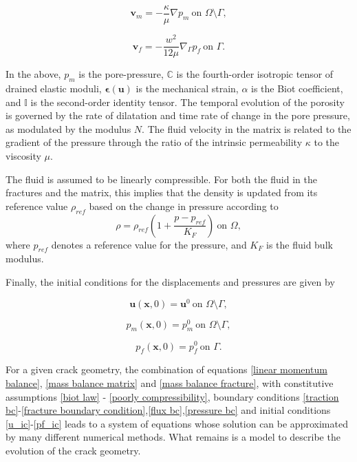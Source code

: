 \begin{equation}\label{darcy law}
    \textbf{v}_m = -\dfrac{\kappa}{\mu}\nabla p_m \ \text{on } \Omega\setminus\Gamma,
\end{equation}

\begin{equation}\label{cubic law}
    \textbf{v}_f = -\dfrac{w^2}{12\mu}\nabla_{\Gamma} p_f \ \text{on } \Gamma.
\end{equation}

In the above, $p_m$ is the pore-pressure, $\mathbb{C}$ is the fourth-order isotropic tensor of drained elastic moduli,  $\boldsymbol\epsilon(\textbf{u})$ is the mechanical strain, $\alpha$ is the Biot coefficient, and $\mathbb{I}$ is the second-order identity tensor. The temporal evolution of the porosity is governed by the rate of dilatation and time rate of change in the pore pressure, as modulated by the modulus $N$.  The fluid velocity in the matrix is related to the gradient of the pressure through the ratio of the intrinsic permeability $\kappa$ to the viscosity $\mu$.    

The fluid is assumed to be linearly compressible.  For both the fluid in the fractures and the matrix, this implies that the density is updated from its reference value $\rho_{ref}$ based on the change in pressure according to
\begin{equation}\label{poorly compressibility}
    \rho = \rho_{ref} \left(1 + \dfrac{p  - p_{ref}}{K_F}\right) \ \text{on } \Omega,
\end{equation}
where $p_{ref}$ denotes a reference value for the pressure, and $K_F$ is the fluid bulk modulus. 

Finally, the initial conditions for the displacements and pressures are given by

\begin{equation}\label{u_ic}
    \textbf{u}(\textbf{x},0) = \textbf{u}^0  \ \text{on } \Omega\setminus\Gamma,
\end{equation}

\begin{equation}\label{pm_ic}
    p_m(\textbf{x},0)= p^0_m  \ \text{on } \Omega\setminus\Gamma,
\end{equation}

\begin{equation}\label{pf_ic}
    p_f(\textbf{x},0) = p^0_f  \ \text{on } \Gamma.
\end{equation}

For a given crack geometry, the combination of equations \eqref{linear momentum balance}, \eqref{mass balance matrix} and \eqref{mass balance fracture}, with constitutive assumptions \eqref{biot law} - \eqref{poorly compressibility}, boundary conditions \eqref{traction bc}-\eqref{fracture boundary condition},\eqref{flux bc},\eqref{pressure bc} and initial conditions \eqref{u_ic}-\eqref{pf_ic} leads to a system of equations whose solution can be approximated by many different numerical methods.
What remains is a model to describe the evolution of the crack geometry.

